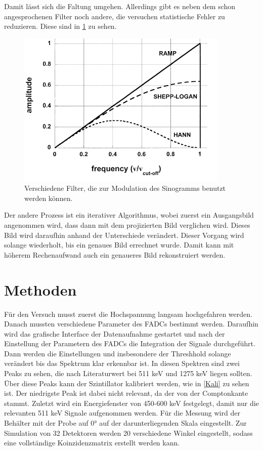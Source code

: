 Damit lässt sich die Faltung umgehen. Allerdings gibt es neben dem schon angesprochenen Filter noch andere, die versuchen statistische Fehler zu reduzieren. Diese sind in \cref{Filter} zu sehen.


\begin{figure}[h!]
	\centering
	\includegraphics[width=0.9\textwidth]{Filter.png}
	\caption{Verschiedene Filter, die zur Modulation des Sinogramms benutzt werden können.}
	\label{Filter}
\end{figure}

Der andere Prozess ist ein iterativer Algorithmus, wobei zuerst ein Ausgangsbild angenommen wird, dass dann mit dem projizierten Bild verglichen wird. Dieses Bild wird daraufhin anhand der Unterschiede verändert. Dieser Vorgang wird solange wiederholt, bis ein genaues Bild errechnet wurde. Damit kann mit höherem Rechenaufwand auch ein genaueres Bild rekonstruiert werden.

\section{Methoden}
Für den Versuch musst zuerst die Hochspannung langsam hochgefahren werden. Danach mussten verschiedene Parameter des FADCs bestimmt werden. 
Daraufhin wird das grafische Interface der Datenaufnahme gestartet und nach der Einstellung der Parametern des FADCs die Integration der Signale durchgeführt. Dann werden die Einstellungen und insbesondere der Threshhold solange verändert bis das Spektrum klar erkennbar ist. In diesen Spektren sind zwei Peaks zu sehen, die nach Literaturwert bei 511 keV und 1275 keV liegen sollten. Über diese Peaks kann der Szintillator kalibriert werden, wie in \cref{Kali} zu sehen ist. Der niedrigste Peak ist dabei nicht relevant, da der von der Comptonkante stammt.
Zuletzt wird ein Energiefenster von 450-600 keV festgelegt, damit nur die relevanten 511 keV Signale aufgenommen werden. Für die Messung wird der Behälter mit der Probe auf 0° auf der darunterliegenden Skala eingestellt. Zur Simulation von 32 Detektoren werden 20 verschiedene Winkel eingestellt, sodass eine vollständige Koinzidenzmatrix erstellt werden kann. 

